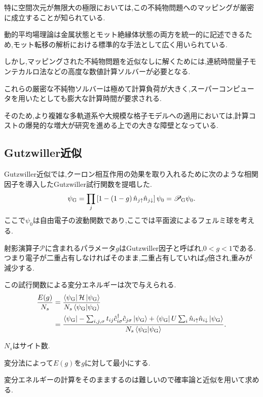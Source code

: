 特に空間次元が無限大の極限においては,この不純物問題へのマッピングが厳密に成立することが知られている.

動的平均場理論は金属状態とモット絶縁体状態の両方を統一的に記述できるため,モット転移の解析における標準的な手法として広く用いられている.

しかし,マッピングされた不純物問題を近似なしに解くためには,連続時間量子モンテカルロ法などの高度な数値計算ソルバーが必要となる.

これらの厳密な不純物ソルバーは極めて計算負荷が大きく,スーパーコンピュータを用いたとしても膨大な計算時間が要求される.

そのため,より複雑な多軌道系や大規模な格子モデルへの適用においては,計算コストの爆発的な増大が研究を進める上での大きな障壁となっている.
\subsection{Gutzwiller近似}
Gutzwiller近似では,クーロン相互作用の効果を取り入れるために次のような相関因子を導入したGutzwiller試行関数を提唱した.
\begin{equation}
    \psi_{\text{G}}=\prod_{j}\left[ 1-\left( 1-g \right)\hat{n}_{j\uparrow}\hat{n}_{j\downarrow} \right]\psi_{\text{0}}=\mathscr{P}_{\text{G}}\psi_{0}.
\end{equation}
ここで\(\psi_{0}\)は自由電子の波動関数であり,ここでは平面波によるフェルミ球を考える.

射影演算子\(\mathscr{P}\)に含まれるパラメータ\(g\)はGutzwiller因子と呼ばれ,\(0<g<1\)である.
つまり電子が二重占有しなければそのまま,二重占有していれば\(g\)倍され,重みが減少する.

この試行関数による変分エネルギーは次で与えられる.
\begin{equation}
\begin{split}
    \frac{E(g)}{N_{s}}&=\frac{\bra{\psi_{\text{G}}}\mathcal{H}\ket{\psi_{\text{G}}}}{N_{s}\braket{\psi_{\text{G}}}}\\
        &=\frac{\bra{\psi_{\text{G}}}-\sum_{i,j,\sigma}t_{ij}\hat{c}^\dagger_{i\sigma}\hat{c}_{j\sigma}\ket{\psi_{\text{G}}}+\bra{\psi_{\text{G}}}U\sum_{i}\hat{n}_{i\uparrow}\hat{n}_{i\downarrow}\ket{\psi_{\text{G}}}}{N_{s}\braket{\psi_{\text{G}}}}.
\end{split}
\label{eq:var_energy}
\end{equation}

\(N_{s}\)はサイト数.

変分法によって\(E(g)\)を\(g\)に対して最小にする.

変分エネルギーの計算をそのままするのは難しいので確率論と近似を用いて求める.

